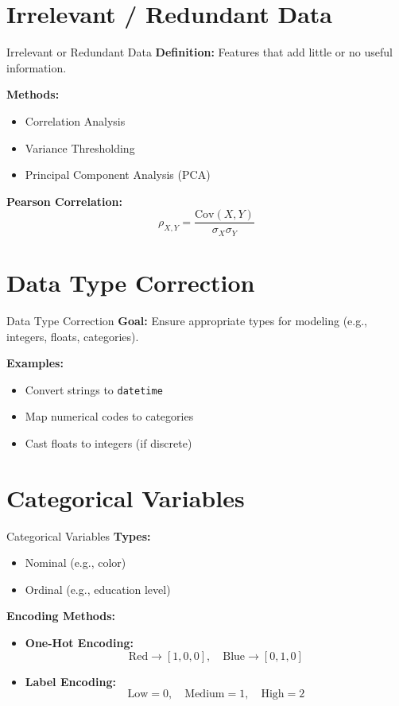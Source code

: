 \documentclass{beamer}
\begin{document}
\section{Irrelevant / Redundant Data}
\begin{frame}{Irrelevant or Redundant Data}
\textbf{Definition:} Features that add little or no useful information.

\textbf{Methods:}
\begin{itemize}
    \item Correlation Analysis
    \item Variance Thresholding
    \item Principal Component Analysis (PCA)
\end{itemize}

\textbf{Pearson Correlation:}
\[
\rho_{X,Y} = \frac{\text{Cov}(X, Y)}{\sigma_X \sigma_Y}
\]
\end{frame}

\section{Data Type Correction}
\begin{frame}{Data Type Correction}
\textbf{Goal:} Ensure appropriate types for modeling (e.g., integers, floats, categories).

\textbf{Examples:}
\begin{itemize}
    \item Convert strings to \texttt{datetime}
    \item Map numerical codes to categories
    \item Cast floats to integers (if discrete)
\end{itemize}
\end{frame}

\section{Categorical Variables}
\begin{frame}{Categorical Variables}
\textbf{Types:}
\begin{itemize}
    \item Nominal (e.g., color)
    \item Ordinal (e.g., education level)
\end{itemize}

\textbf{Encoding Methods:}
\begin{itemize}
    \item \textbf{One-Hot Encoding:} 
    \[
    \text{Red} \rightarrow [1, 0, 0],\quad \text{Blue} \rightarrow [0, 1, 0]
    \]
    \item \textbf{Label Encoding:} 
    \[
    \text{Low} = 0,\quad \text{Medium} = 1,\quad \text{High} = 2
    \]
\end{itemize}
\end{frame}
\end{document}
